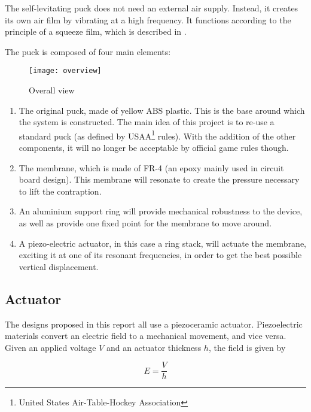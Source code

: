 The self-levitating puck does not need an external air supply. Instead, it
creates its own air film by vibrating at a high frequency. It functions
according to the principle of a squeeze film, which is described in
.

The puck is composed of four main elements:

\begin{figure}[h]
  \begin{center}
    \texttt{[image: overview]}
  \end{center}
  \caption{Overall view}
  \label{fig:overview}
\end{figure}

\begin{enumerate}[A]
  \item The original puck, made of yellow ABS plastic. This is the base around
    which the system is constructed. The main idea of this project is to re-use a
    standard puck (as defined by USAA\footnote{United States Air-Table-Hockey
    Association} rules). With the addition of the other
    components, it will no longer be acceptable by official game rules though.
  \item The membrane, which is made of FR-4 (an epoxy mainly used in circuit
    board design). This membrane will resonate to create the pressure necessary
    to lift the contraption.
  \item An aluminium support ring will provide mechanical robustness to the
    device, as well as provide one fixed point for the membrane to move around.
  \item A piezo-electric actuator, in this case a ring stack, will actuate
    the membrane, exciting it at one of its resonant frequencies, in order to
    get the best possible vertical displacement.
\end{enumerate}

\subsection{Actuator}

The designs proposed in this report all use a piezoceramic actuator.
Piezoelectric materials convert an electric field to a mechanical movement, and
vice versa. Given an applied voltage $V$ and an actuator thickness $h$, the
field is given by

\begin{equation}
  E = \frac{V}{h}
  \label{eq:field}
\end{equation}

